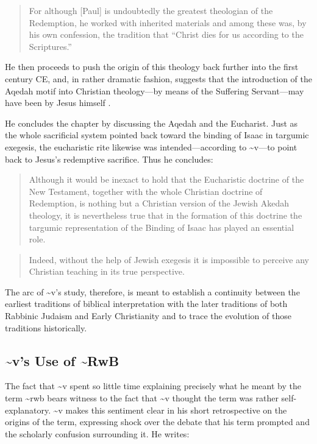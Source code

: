 \begin{quote}
For although {[}Paul{]} is undoubtedly the greatest theologian of the
Redemption, he worked with inherited materials and among these was, by
his own confession, the tradition that ``Christ dies for us according to
the Scriptures.''\autocite[221]{vermes1961}
\end{quote}

He then proceeds to push the origin of this theology back further into
the first century CE, and, in rather dramatic fashion, suggests that the
introduction of the Aqedah motif into Christian theology---by means of
the Suffering Servant---may have been by Jesus himself
\autocite[223]{vermes1961}.

He concludes the chapter by discussing the Aqedah and the Eucharist.
Just as the whole sacrificial system pointed back toward the binding of
Isaac in targumic exegesis, the eucharistic rite likewise was
intended---according to \textasciitilde{}v---to point back to Jesus's
redemptive sacrifice. Thus he concludes:

\begin{quote}
Although it would be inexact to hold that the Eucharistic doctrine of
the New Testament, together with the whole Christian doctrine of
Redemption, is nothing but a Christian version of the Jewish Akedah
theology, it is nevertheless true that in the formation of this doctrine
the targumic representation of the Binding of Isaac has played an
essential role.
\end{quote}

\begin{quote}
Indeed, without the help of Jewish exegesis it is impossible to perceive
any Christian teaching in its true
perspective.\autocite[227]{vermes1961}
\end{quote}

The arc of \textasciitilde{}v's study, therefore, is meant to establish
a continuity between the earliest traditions of biblical interpretation
with the later traditions of both Rabbinic Judaism and Early
Christianity and to trace the evolution of those traditions
historically.

\subsection{\textasciitilde{}v's Use of
\textasciitilde{}RwB}\label{vs-use-of-rwb}

The fact that \textasciitilde{}v spent so little time explaining
precisely what he meant by the term \textasciitilde{}rwb bears witness
to the fact that \textasciitilde{}v thought the term was rather
self-explanatory. \textasciitilde{}v makes this sentiment clear in his
short retrospective on the origins of the term, expressing shock over
the debate that his term prompted and the scholarly confusion
surrounding it. He writes:

